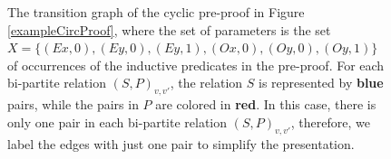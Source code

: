 \begin{figure}[t]
\begin{mdframed}
\end{mdframed}

\caption{The transition graph of the cyclic pre-proof in Figure \ref{exampleCircProof}, where the set of parameters is the set $X = \{ (Ex,0), (Ey,0), (Ey,1), (Ox,0), (Oy,0), (Oy,1)\}$ of occurrences of the inductive predicates in the pre-proof. 
For each bi-partite relation
$(S,P)_{v,v'}$, the relation $S$ is represented by {\color{blue} \bf blue} pairs, while the pairs in $P$ are colored in {\color{red} \bf red}. In this case, there is only one pair in each bi-partite relation $(S,P)_{v,v'}$, therefore, we label the edges with just one pair to simplify the presentation.}

\label{exampleTransGraph}
\end{figure}